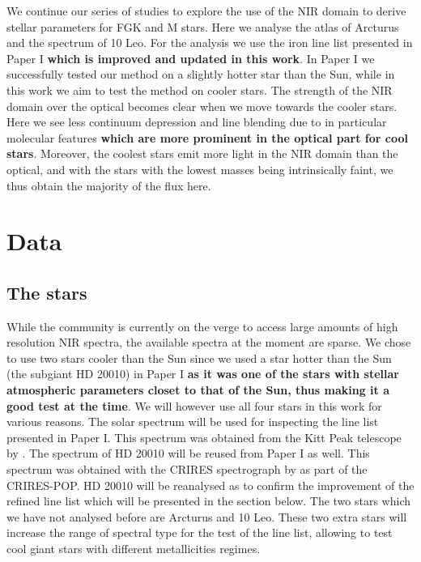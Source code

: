 \documentclass{aa}
\begin{document}
We continue our series of studies to explore the use of the NIR domain to derive stellar parameters
for FGK and M stars. Here we analyse the atlas of Arcturus and the spectrum of 10 Leo. For the
analysis we use the iron line list presented in Paper I {\bf which is improved and updated in this
work}. In Paper I we successfully tested our method on a slightly hotter star than the Sun, while in
this work we aim to test the method on cooler stars. The strength of the NIR domain over the optical
becomes clear when we move towards the cooler stars. Here we see less continuum depression and line
blending due to in particular molecular features {\bf which are more prominent in the optical part
for cool stars}. Moreover, the coolest stars emit more light in the NIR domain than the optical, and
with the stars with the lowest masses being intrinsically faint, we thus obtain the majority of the
flux here.



\section{Data}
\label{sec:data}

\subsection{The stars}

While the community is currently on the verge to access large amounts of high resolution NIR
spectra, the available spectra at the moment are sparse. We chose to use two stars cooler than the
Sun since we used a star hotter than the Sun (the subgiant HD 20010) in Paper I {\bf as it was one
of the stars with stellar atmospheric parameters closet to that of the Sun, thus making it a good
test at the time}. We will however use all four stars in this work for various reasons. The
solar spectrum will be used for inspecting the line list presented in Paper I. This spectrum was
obtained from the Kitt Peak telescope by \citet{Hinkle1995}. The spectrum of HD 20010 will be reused
from Paper I as well. This spectrum was obtained with the CRIRES spectrograph by
\citet{Lebzelter2012} as part of the CRIRES-POP. HD 20010 will be reanalysed as to confirm the
improvement of the refined line list which will be presented in the section below. The two stars
which we have not analysed before are Arcturus and 10 Leo. These two extra stars will increase the
range of spectral type for the test of the line list, allowing to test cool giant stars with
different metallicities regimes.
\end{document}
